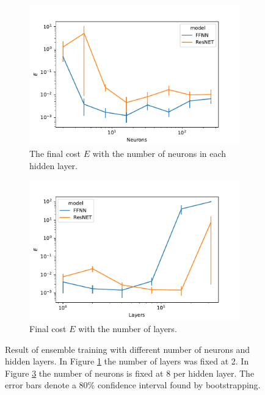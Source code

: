 \begin{figure}\label{fig:curve_1_parmas_eks}
    \begin{subfigure}[t]{0.5\textwidth}
        \centering
        \includegraphics[width=\linewidth]{figures/curve_1/eks_5/neurons_error.pdf}
        \caption{The final cost \(E\) with the number of neurons in each hidden layer.}
        \label{fig:curve_1_neuron_error}
    \end{subfigure}
    \begin{subfigure}[t]{0.5\textwidth}
        \centering
        \includegraphics[width=\linewidth]{figures/curve_1/eks_5/layer_error.pdf}
        \caption{Final cost \(E\) with the number of layers.}
        \label{fig:curve_1_layer_error}
    \end{subfigure}
    \caption{Result of ensemble training with different number of neurons and hidden layers. In Figure \ref{fig:curve_1_neuron_error} the number of layers was fixed at 2. In Figure \ref{fig:curve_1_layer_error} the number of neurons is fixed at 8 per hidden layer. The error bars denote a 80\% confidence interval found by bootstrapping.}
\end{figure}

